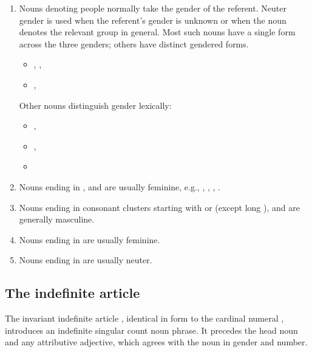 \begin{enumerate}[label=(\arabic*), wide]
    \item Nouns denoting people normally take the gender of the referent. Neuter gender is used when the referent's gender is unknown or when the noun denotes the relevant group in general. Most such nouns have a single form across the three genders; others have distinct gendered forms.
    \begin{itemize}
        \item {}, , 
        \item {}, 
    \end{itemize}
    Other nouns distinguish gender lexically:
    \begin{itemize}
        \item {}, 
        \item {}, 
        \item {}
    \end{itemize}
    
    \item Nouns ending in ,  and  are usually feminine, e.g., , , , .
    
    \item Nouns ending in consonant clusters starting with  or  (except long ),  and  are generally masculine.
    
    \item Nouns ending in  are usually feminine.
    \item Nouns ending in  are usually neuter.
\end{enumerate}

\subsection{The indefinite article}
\label{sec:indefinite-article}

The invariant indefinite article , identical in form to the cardinal numeral , introduces an indefinite singular count noun phrase. It precedes the head noun and any attributive adjective, which agrees with the noun in gender and number.

